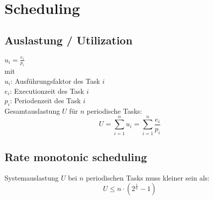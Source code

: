 \section{Scheduling}

\subsection{Auslastung / Utilization}
\begin{multicols}{2}

	$u_i = \frac{e_i}{p_i}$ \\
	
	mit \\
	$u_i$: Ausführungsfaktor des Task $i$ \\
	$e_i$: Executionzeit des Task $i$ \\
	$p_i$: Periodenzeit des Task $i$ \\

	
	Gesamtauslastung $U$ für $n$ periodische Tasks:
	\begin{equation*}
		U = \sum\limits_{i=1}^{n} u_i = \sum\limits_{i=1}^{n} \frac{e_i}{p_i}
	\end{equation*}



\columnbreak

\subsection{Rate monotonic scheduling}

Systemauslastung $U$ bei $n$ periodischen Tasks muss kleiner sein als: \\

\begin{equation*}
	U \leq n \cdot \left( 2^{\frac{1}{n}} - 1\right)
\end{equation*}


\end{multicols}
